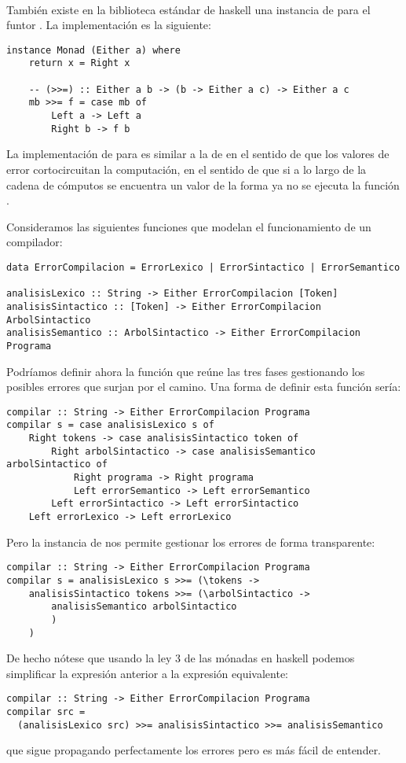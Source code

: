 \paragraph{}
También existe en la biblioteca estándar de haskell
una instancia de  para el funtor
. La implementación es la siguiente:
\begin{verbatim}
instance Monad (Either a) where
    return x = Right x

    -- (>>=) :: Either a b -> (b -> Either a c) -> Either a c
    mb >>= f = case mb of
        Left a -> Left a
        Right b -> f b
\end{verbatim}
La implementación de  para  es similar
a la de  en el sentido de que los valores de error
cortocircuitan la computación, en el sentido de que si a lo largo
de la cadena de cómputos se encuentra un valor de la forma
 ya no se ejecuta la función .

Consideramos las siguientes funciones que modelan el funcionamiento
de un compilador:
\begin{verbatim}
data ErrorCompilacion = ErrorLexico | ErrorSintactico | ErrorSemantico

analisisLexico :: String -> Either ErrorCompilacion [Token]
analisisSintactico :: [Token] -> Either ErrorCompilacion ArbolSintactico
analisisSemantico :: ArbolSintactico -> Either ErrorCompilacion Programa
\end{verbatim}
Podríamos definir ahora la función  que reúne las
tres fases gestionando los posibles errores que surjan por el
camino. Una forma de definir esta función sería:
\begin{verbatim}
compilar :: String -> Either ErrorCompilacion Programa
compilar s = case analisisLexico s of
    Right tokens -> case analisisSintactico token of
        Right arbolSintactico -> case analisisSemantico arbolSintactico of
            Right programa -> Right programa
            Left errorSemantico -> Left errorSemantico
        Left errorSintactico -> Left errorSintactico
    Left errorLexico -> Left errorLexico
\end{verbatim}
Pero la instancia de  nos permite gestionar los errores de
forma transparente:
\begin{verbatim}
compilar :: String -> Either ErrorCompilacion Programa
compilar s = analisisLexico s >>= (\tokens ->
    analisisSintactico tokens >>= (\arbolSintactico ->
        analisisSemantico arbolSintactico
        )
    )
\end{verbatim}
De hecho nótese que usando la ley 3 de las mónadas en haskell
podemos simplificar la expresión anterior a la expresión
equivalente:
\begin{verbatim}
compilar :: String -> Either ErrorCompilacion Programa
compilar src =
  (analisisLexico src) >>= analisisSintactico >>= analisisSemantico
\end{verbatim}
que sigue propagando perfectamente los errores pero es
más fácil de entender.

